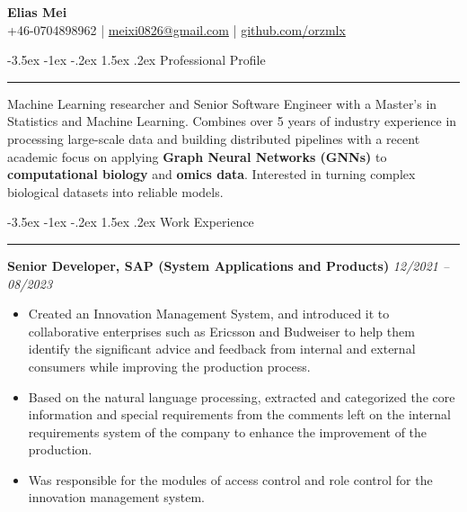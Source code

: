 \documentclass[11pt,a4paper]{article}
\makeatletter
\renewcommand{\section}{%
  \@startsection{section}{1}{\z@}%
  {-3.5ex \@plus -1ex \@minus -.2ex}%
  {1.5ex \@plus.2ex}%
  {\normalfont\Large\bfseries\scshape\color{blue!70!black}}%
}
\let\oldsection\section
\renewcommand{\section}[1]{\oldsection{#1}\vspace{-1ex}\noindent\rule{\linewidth}{1pt}\par\vspace{1ex}}
\makeatother
\begin{document}
\begin{center}
    {\Huge \textbf{Elias Mei}} \\ \vspace{5pt}
    +46-0704898962 \quad | \quad \href{mailto:meixi0826@gmail.com}{meixi0826@gmail.com} \quad | \quad \href{https://github.com/orzmlx}{github.com/orzmlx}
\end{center}

\vspace{5pt}

\section{Professional Profile}
Machine Learning researcher and Senior Software Engineer with a Master's in Statistics and Machine Learning. Combines over 5 years of industry experience in processing large-scale data and building distributed pipelines with a recent academic focus on applying \textbf{Graph Neural Networks (GNNs)} to \textbf{computational biology} and \textbf{omics data}. Interested in turning complex biological datasets into reliable models.

\vspace{10pt}

\section{Work Experience}

\textbf{Senior Developer, SAP (System Applications and Products)} \hfill \textit{12/2021 -- 08/2023}
\begin{itemize}
    \item Created an Innovation Management System, and introduced it to collaborative enterprises such as Ericsson and Budweiser to help them identify the significant advice and feedback from internal and external consumers while improving the production process.
    \item Based on the natural language processing, extracted and categorized the core information and special requirements from the comments left on the internal requirements system of the company to enhance the improvement of the production.
    \item Was responsible for the modules of access control and role control for the innovation management system.
\end{itemize}

\vspace{5pt}
\end{document}

